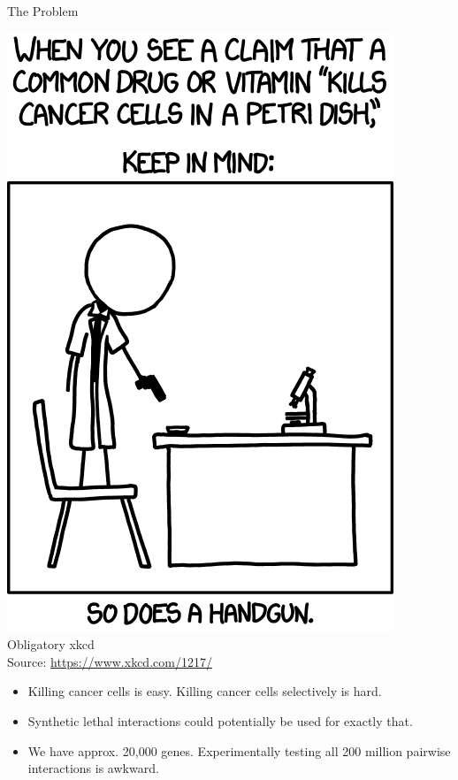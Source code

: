 \begin{frame}{The Problem}
\begin{minipage}{0.4\linewidth}
	\includegraphics[width=0.8\linewidth]{"cells_2x"}\\[-1ex]
	{\tiny Obligatory xkcd\\Source: \href{https://www.xkcd.com/1217/}{https://www.xkcd.com/1217/}}
\end{minipage}%
\begin{minipage}{0.6\linewidth}
	\begin{itemize}
		\item Killing cancer cells is easy. Killing cancer cells selectively is hard.
		\item Synthetic lethal interactions could potentially be used for exactly that.\cite{Kaelin:2005gm}
		\item We have approx. 20,000 genes. Experimentally testing all 200 million pairwise interactions is awkward.
	\end{itemize}
\end{minipage}
\end{frame}


